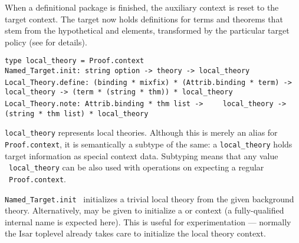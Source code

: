 \begin{isabellebody}
\begin{isamarkuptext}
  \noindent When a definitional package is finished, the auxiliary
  context is reset to the target context.  The target now holds
  definitions for terms and theorems that stem from the hypothetical
  \isa{{\isasymDEFINE}} and \isa{{\isasymNOTE}} elements, transformed by
  the particular target policy (see
  \cite[\S4--5]{Haftmann-Wenzel:2009} for details).%
\end{isamarkuptext}%
\isamarkuptrue%
%
\isadelimmlref
%
\endisadelimmlref
%
\isatagmlref
%
\begin{isamarkuptext}%
\begin{mldecls}
  \verb|type local_theory = Proof.context| \\
  \verb|Named_Target.init: string option -> theory -> local_theory| \\[1ex]
  \verb|Local_Theory.define: (binding * mixfix) * (Attrib.binding * term) ->|\isasep\isanewline%
\verb|    local_theory -> (term * (string * thm)) * local_theory| \\
  \verb|Local_Theory.note: Attrib.binding * thm list ->|\isasep\isanewline%
\verb|    local_theory -> (string * thm list) * local_theory| \\
  \end{mldecls}

  \begin{description}

  \item \verb|local_theory| represents local theories.  Although
  this is merely an alias for \verb|Proof.context|, it is
  semantically a subtype of the same: a \verb|local_theory| holds
  target information as special context data.  Subtyping means that
  any value ~\verb|local_theory| can be also used
  with operations on expecting a regular ~\verb|Proof.context|.

  \item \verb|Named_Target.init|~ initializes a
  trivial local theory from the given background theory.
  Alternatively,  may be given to initialize a
  \hyperlink{command.locale}{\mbox{}} or \hyperlink{command.class}{\mbox{}} context (a fully-qualified
  internal name is expected here).  This is useful for experimentation
  --- normally the Isar toplevel already takes care to initialize the
  local theory context.


\end{description}
\end{isamarkuptext}
\end{isabellebody}
